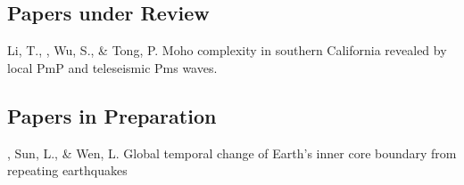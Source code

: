 \subsection*{Papers under Review}
\begin{etaremune}
\item
    Li, T., \Yao, Wu, S., \& Tong, P.
    Moho complexity in southern California revealed by local PmP and teleseismic Pms waves.
\end{etaremune}

\subsection*{Papers in Preparation}
\begin{etaremune}
\item
    \Yao, Sun, L., \& Wen, L.
    Global temporal change of Earth's inner core boundary from repeating earthquakes
\end{etaremune}
